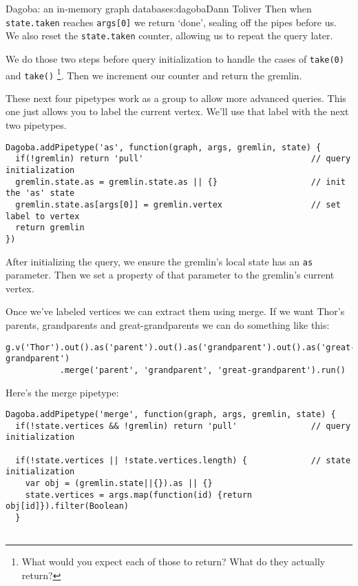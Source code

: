 \begin{aosachapter}{Dagoba: an in-memory graph database}{s:dagoba}{Dann Toliver}
Then when \texttt{state.taken} reaches \texttt{args{[}0{]}} we return
`done', sealing off the pipes before us. We also reset the
\texttt{state.taken} counter, allowing us to repeat the query later.

We do those two steps before query initialization to handle the cases of
\texttt{take(0)} and \texttt{take()} \footnote{What would you expect
  each of those to return? What do they actually return?}. Then we
increment our counter and return the gremlin.

\label{as}

These next four pipetypes work as a group to allow more advanced
queries. This one just allows you to label the current vertex. We'll use
that label with the next two pipetypes.

\begin{verbatim}
Dagoba.addPipetype('as', function(graph, args, gremlin, state) {
  if(!gremlin) return 'pull'                                  // query initialization
  gremlin.state.as = gremlin.state.as || {}                   // init the 'as' state
  gremlin.state.as[args[0]] = gremlin.vertex                  // set label to vertex
  return gremlin
})
\end{verbatim}

After initializing the query, we ensure the gremlin's local state has an
\texttt{as} parameter. Then we set a property of that parameter to the
gremlin's current vertex.

\label{merge}

Once we've labeled vertices we can extract them using merge. If we want
Thor's parents, grandparents and great-grandparents we can do something
like this:

\begin{verbatim}
g.v('Thor').out().as('parent').out().as('grandparent').out().as('great-grandparent')
           .merge('parent', 'grandparent', 'great-grandparent').run()
\end{verbatim}

Here's the merge pipetype:

\begin{verbatim}
Dagoba.addPipetype('merge', function(graph, args, gremlin, state) {
  if(!state.vertices && !gremlin) return 'pull'               // query initialization

  if(!state.vertices || !state.vertices.length) {             // state initialization
    var obj = (gremlin.state||{}).as || {}
    state.vertices = args.map(function(id) {return obj[id]}).filter(Boolean)
  }


\end{verbatim}
\end{aosachapter}

